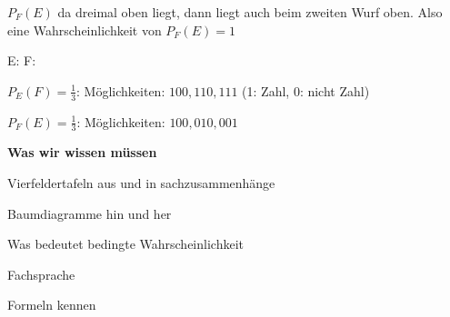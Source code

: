$P_F(E)$ da dreimal  oben liegt, dann liegt auch beim
zweiten Wurf  oben. Also eine Wahrscheinlichkeit von
$P_F(E)=1$

\startframedtask
\startitemize[a,packed][start=2,stopper=)]
\item
  E:  F: 
\stopitemize

\stopframedtask

$P_E(F) = \frac{1}{3}$: Möglichkeiten: $100,110,111$ (1: Zahl, 0: nicht
Zahl)

$P_F(E) = \frac{1}{3}$: Möglichkeiten: $100,010,001$

\startframedtask
{\bf Was wir wissen müssen}

\startitemize[packed]
\item
  Vierfeldertafeln aus und in sachzusammenhänge
\item
  Baumdiagramme hin und her
\item
  Was bedeutet bedingte Wahrscheinlichkeit
\item
  Fachsprache
\item
  Formeln kennen
\stopitemize

\stopframedtask
